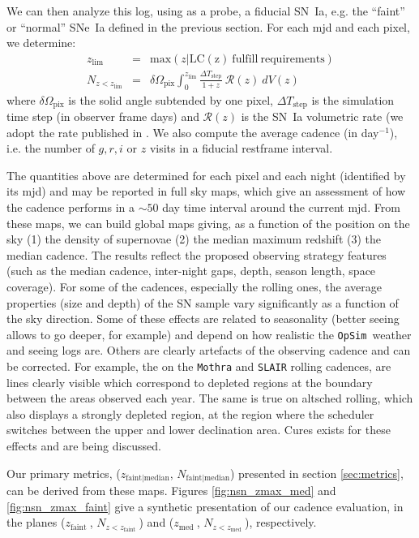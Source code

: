 \documentclass[a4paper,10pt]{article}
\newcommand{\zfaint}{$z_{\mathrm{faint}}\ $}
\newcommand{\nsnfaint}{$N_{z<z_{\mathrm{faint}}}\ $}
\newcommand{\zmed}{$z_{\mathrm{med}}\ $}
\newcommand{\nsnmed}{$N_{z<z_{\mathrm{med}}}\ $}
\newcommand{\opsim}{{\tt OpSim\ }}
\begin{document}
We can then analyze this log, using as a probe, a fiducial SN~Ia,
e.g. the ``faint'' or ``normal'' SNe~Ia defined in the previous
section. For each mjd and each pixel, we determine:
\begin{eqnarray}
  z_{\mathrm{lim}} & = & \mathrm{max}\left(z | \mathrm{LC(z)\ fulfill\ requirements}\right) \\
  N_{z<z_{\mathrm{lim}}} &= & \delta\Omega_{\mathrm{pix}} \int_0^{z_\mathrm{lim}} \frac{\Delta T_{\mathrm{step}}}{1+z}\ {\mathcal{R}}(z)\ dV(z)
\end{eqnarray}
where $\delta\Omega_{\mathrm{pix}}$ is the solid angle subtended by
one pixel, $\Delta T_{\mathrm{step}}$ is the simulation time step (in
observer frame days) and $\mathcal{R}(z)$ is the SN~Ia volumetric rate
(we adopt the rate published in \cite{perrett}.  We also
compute the average cadence (in day$^{-1}$), i.e. the number of $g, r,
i$ or $z$ visits in a fiducial restframe interval.


The quantities above are determined for each pixel and each night
(identified by its mjd) and may be reported in full sky maps, which give
an assessment of how the cadence performs in a $\sim 50$ day time
interval around the current mjd. From these maps, we can build global
maps giving, as a function of the position on the sky (1) the density
of supernovae (2) the median maximum redshift (3) the median cadence.
The results reflect the proposed observing strategy features (such as the median cadence, inter-night gaps, depth, season length, space coverage). For some of the cadences, especially the rolling ones, the average properties (size and
depth) of the SN sample vary significantly as a function of the sky
direction. Some of these effects are related to seasonality (better
seeing allows to go deeper, for example) and depend on how realistic
the \opsim weather and seeing logs are. Others are clearly artefacts
of the observing cadence and can be corrected. For example, the on the
{\tt Mothra} and {\tt SLAIR} rolling cadences, are lines clearly
visible which correspond to depleted regions at the boundary between
the areas observed each year. The same is true on altsched rolling,
which also displays a strongly depleted region, at the region where
the scheduler switches between the upper and lower declination area.
Cures exists for these effects and are being discussed. 

Our primary metrics, ($z_{\mathrm{faint|median}}$, $N_{\mathrm{faint|median}}$) 
presented in section \ref{sec:metrics}, can be derived from these
maps.  Figures \ref{fig:nsn_zmax_med} and \ref{fig:nsn_zmax_faint}
give a synthetic presentation of our cadence evaluation, in the planes
(\zfaint, \nsnfaint) and (\zmed, \nsnmed), respectively.
\end{document}
